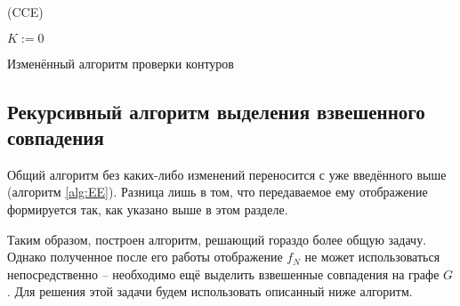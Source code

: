 \begin{algorithm}[H]
	\Large
	\Begin(CCE){
		$K := 0$
		
	}
	
	\caption{Изменённый алгоритм проверки контуров}
	\label{alg:MCCE}
\end{algorithm}


\subsection{Рекурсивный алгоритм выделения взвешенного совпадения}

Общий алгоритм без каких-либо изменений переносится с уже введённого выше (алгоритм \ref{alg:EE}). Разница лишь в том, что передаваемое ему отображение формируется так, как указано выше в этом разделе.

Таким образом, построен алгоритм, решающий гораздо более общую задачу. Однако полученное после его работы отображение $f_N$ не может использоваться непосредственно -- необходимо ещё выделить взвешенные совпадения на графе $G$. Для решения этой задачи будем использовать описанный ниже алгоритм.

